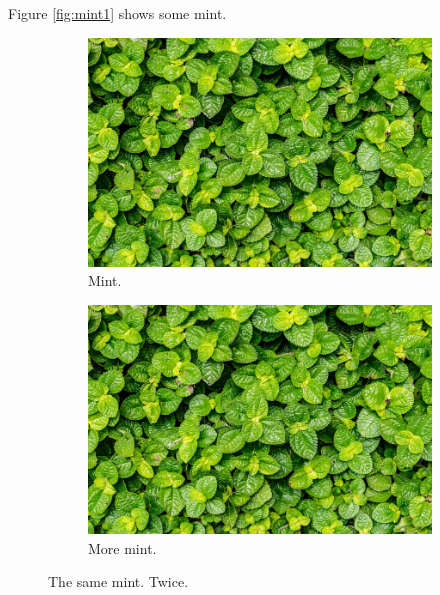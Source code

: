 \documentclass{book}
\begin{document}
Figure \ref{fig:mint1} shows some mint.

\begin{figure}[ht!]
  \centering
  \begin{subfigure}[b]{0.4\linewidth}
    \includegraphics[width=\linewidth]{mint.jpg}
    \caption{Mint.}
  \end{subfigure}
  \begin{subfigure}[b]{0.4\linewidth}
    \includegraphics[width=\linewidth]{mint.jpg}
    \caption{More mint.}
  \end{subfigure}
  \caption{The same mint. Twice.}
  \label{fig:mints1}
\end{figure}

\paragraph{} 
\end{document}
